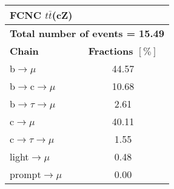 \begin{tabular}{|l|c|}          
	\hline          
	\multicolumn{2}{|l|}{\textbf{FCNC $t\bar{t}$(cZ)}}    \\        
	\hline          
	\multicolumn{2}{|l|}{\textbf{Total number of events = 15.49}}    \\
	\hline
	\textbf{Chain}        									 & \textbf{Fractions $[\%]$} \\                          
	\hline          
	b$\rightarrow \mu$                 					&   44.57  \\          
	b$\rightarrow$c$\rightarrow \mu$     	&    10.68   \\          
	b$\rightarrow \tau \rightarrow \mu$  	&    2.61 \\          
	c$\rightarrow \mu$                 				 &    40.11\\          
	c$\rightarrow \tau \rightarrow \mu$  	&     1.55 \\          
	light$\rightarrow \mu$              			&    0.48  \\          
	prompt$\rightarrow \mu$                	 	&   0.00 \\            
	\hline    
\end{tabular}    
